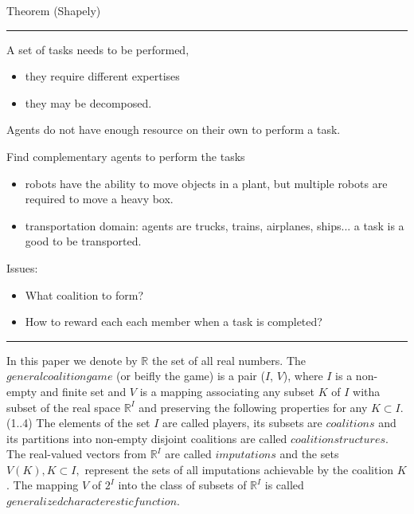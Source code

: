 \documentclass{article}
\begin{document}
Theorem (Shapely) 

\hrule 

A set of tasks needs to be performed,
\begin{itemize}
	\item they require different expertises
	\item they may be decomposed.
\end{itemize}

Agents do not have enough resource on their own to perform a task.

Find complementary agents to perform the tasks
\begin{itemize}
	\item robots have the ability to move objects in a plant, but multiple robots are required to move a heavy box.
	\item transportation domain: agents are trucks, trains, airplanes, ships... a task is a good to be transported.
\end{itemize}

Issues:
\begin{itemize}
	\item What coalition to form?
	\item How to reward each each member when a task is completed?
\end{itemize}

\hrule 

In this paper we denote by $\mathbb{R}$ the set of all real numbers. The $general coalition game$ (or beifly the game) is a pair ($I$, $V$),
where $I$ is a non-empty and finite set and $V$ is a mapping associating any subset $K$ of $I$ witha subset of the real space $\mathbb{R}^I$ and preserving the following properties for any $K \subset I$.
(1..4)
The elements of the set $I$ are called players, its subsets are $coalitions$ and its partitions into non-empty disjoint coalitions are called $coalition structures$. The real-valued vectors from $\mathbb{R}^I$ are called $imputations$ and the sets $V(K), K \subset I,$ represent the sets of all imputations achievable by the coalition $K$. The mapping $V$ of $2^I$ into the class of subsets of $\mathbb{R}^I$ is called $generalized characterestic function$. 



\end{document}
